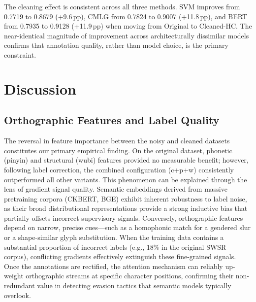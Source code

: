 ﻿\documentclass[12pt]{article}
\begin{document}
The cleaning effect is consistent across all three methods. SVM improves from 0.7719 to 0.8679 (+9.6\,pp), CMLG from 0.7824 to 0.9007 (+11.8\,pp), and BERT from 0.7935 to 0.9128 (+11.9\,pp) when moving from Original to Cleaned-HC. The near-identical magnitude of improvement across architecturally dissimilar models confirms that annotation quality, rather than model choice, is the primary constraint.

\section{Discussion}

\subsection{Orthographic Features and Label Quality}
The reversal in feature importance between the noisy and cleaned datasets constitutes our primary empirical finding. On the original dataset, phonetic (pinyin) and structural (wubi) features provided no measurable benefit; however, following label correction, the combined configuration (c+p+w) consistently outperformed all other variants. This phenomenon can be explained through the lens of gradient signal quality. Semantic embeddings derived from massive pretraining corpora (CKBERT, BGE) exhibit inherent robustness to label noise, as their broad distributional representations provide a strong inductive bias that partially offsets incorrect supervisory signals. Conversely, orthographic features depend on narrow, precise cues—such as a homophonic match for a gendered slur or a shape-similar glyph substitution. When the training data contains a substantial proportion of incorrect labels (e.g., 18\% in the original SWSR corpus), conflicting gradients effectively extinguish these fine-grained signals. Once the annotations are rectified, the attention mechanism can reliably up-weight orthographic streams at specific character positions, confirming their non-redundant value in detecting evasion tactics that semantic models typically overlook.
\end{document}
